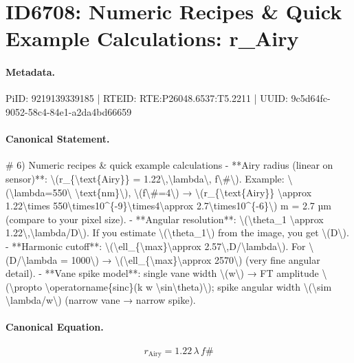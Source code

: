 \section*{ID6708: Numeric Recipes \& Quick Example Calculations: r\_Airy}
\paragraph{Metadata.}
PiID: 9219139339185 | RTEID: RTE:P26048.6537:T5.2211 | UUID: 9c5d64fc-9052-58c4-84e1-a2da4bd66659

\paragraph{Canonical Statement.}
\# 6) Numeric recipes \& quick example calculations - **Airy radius (linear on sensor)**: \textbackslash{}(r\_\{\textbackslash{}text\{Airy\}\} = 1.22\textbackslash{},\textbackslash{}lambda\textbackslash{}, f\textbackslash{}\#\textbackslash{}). Example: \textbackslash{}(\textbackslash{}lambda=550\textbackslash{} \textbackslash{}text\{nm\}\textbackslash{}), \textbackslash{}(f\textbackslash{}\#=4\textbackslash{}) → \textbackslash{}(r\_\{\textbackslash{}text\{Airy\}\} \textbackslash{}approx 1.22\textbackslash{}times 550\textbackslash{}times10\textasciicircum{}\{-9\}\textbackslash{}times4\textbackslash{}approx 2.7\textbackslash{}times10\textasciicircum{}\{-6\}\textbackslash{}) m = 2.7 µm (compare to your pixel size). - **Angular resolution**: \textbackslash{}(\textbackslash{}theta\_1 \textbackslash{}approx 1.22\textbackslash{},\textbackslash{}lambda/D\textbackslash{}). If you estimate \textbackslash{}(\textbackslash{}theta\_1\textbackslash{}) from the image, you get \textbackslash{}(D\textbackslash{}). - **Harmonic cutoff**: \textbackslash{}(\textbackslash{}ell\_\{\textbackslash{}max\}\textbackslash{}approx 2.57\textbackslash{},D/\textbackslash{}lambda\textbackslash{}). For \textbackslash{}(D/\textbackslash{}lambda = 1000\textbackslash{}) → \textbackslash{}(\textbackslash{}ell\_\{\textbackslash{}max\}\textbackslash{}approx 2570\textbackslash{}) (very fine angular detail). - **Vane spike model**: single vane width \textbackslash{}(w\textbackslash{}) → FT amplitude \textbackslash{}(\textbackslash{}propto \textbackslash{}operatorname\{sinc\}(k w \textbackslash{}sin\textbackslash{}theta)\textbackslash{}); spike angular width \textbackslash{}(\textbackslash{}sim \textbackslash{}lambda/w\textbackslash{}) (narrow vane → narrow spike).

\paragraph{Canonical Equation.}
\[
r_{\text{Airy}} = 1.22\,\lambda\, f\#
\]

